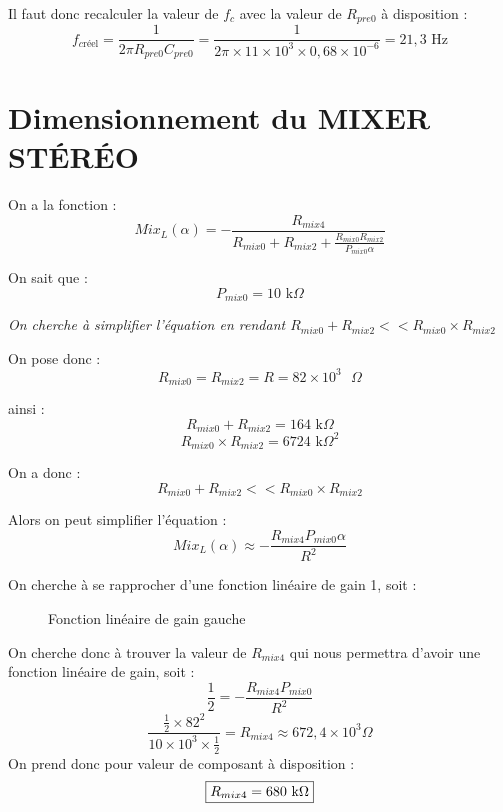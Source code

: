 \documentclass{report}
\begin{document}
Il faut donc recalculer la valeur de \(f_c\) avec la valeur de \(R_{pre0}\) à disposition :
\[ f_{c\text{r\'eel}} = \frac{1}{2\pi R_{pre0} C_{pre0}} = \frac{1}{2\pi \times 11 \times 10^3 \times 0,68 \times 10^{-6}} = 21,3 \text{ Hz}
\]

\newpage

\section{Dimensionnement du MIXER STÉRÉO}
On a la fonction :
\[
Mix_{L}(\alpha) = -\frac{R_{mix4}}{R_{mix0} + R_{mix2} + \frac{R_{mix0} R_{mix2}}{P_{mix0} \alpha}}
\]

On sait que :
\[P_{mix0} = 10 \text{ k}\Omega\]

\textit{On cherche à simplifier l'équation en rendant \(R_{mix0} + R_{mix2} << R_{mix0} \times R_{mix2}\)}

On pose donc :
\[R_{mix0} = R_{mix2} = R = 82 \times 10^3 \text{ }\Omega
\]

ainsi :
\[R_{mix0} + R_{mix2} = 164 \text{ k}\Omega
\]
\[R_{mix0} \times R_{mix2} = 6724 \text{ k}\Omega^2
\]

On a donc :
\[R_{mix0} + R_{mix2} << R_{mix0} \times R_{mix2}
\]

Alors on peut simplifier l'équation :
\[Mix_L(\alpha) \approx -\frac{R_{mix4} P_{mix0} \alpha}{R^2}
\]

On cherche à se rapprocher d'une fonction linéaire de gain 1, soit :

\begin{figure}[h]
    \centering
    \caption{Fonction linéaire de gain gauche}
    \label{fig:mixer_linear_left}
\end{figure}

On cherche donc à trouver la valeur de \(R_{mix4}\) qui nous permettra d'avoir une fonction linéaire de gain, soit :
\[\frac{1}{2} = -\frac{R_{mix4} P_{mix0}}{R^2} 
\]
\[\frac{\frac{1}{2} \times 82^2}{10 \times 10^3 \times \frac{1}{2}} = R_{mix4} \approx  672,4 \times 10^3 \Omega
\]
On prend donc pour valeur de composant à disposition :
\[\fbox{$R_{mix4} = 680 \text{ k}\Omega$}
\]
\end{document}
